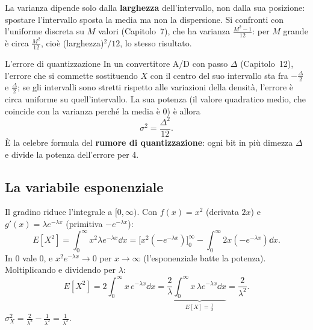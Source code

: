 La varianza dipende solo dalla \textbf{larghezza} dell'intervallo, non dalla sua posizione: spostare l'intervallo sposta
la media ma non la dispersione. Si confronti con l'uniforme discreta su $M$ valori (Capitolo~7), che ha varianza
$\frac{M^2 - 1}{12}$: per $M$ grande è circa $\frac{M^2}{12}$, cioè (larghezza)$^2/12$, lo stesso risultato.

\begin{esempio}{L'errore di quantizzazione}
In un convertitore A/D con passo $\Delta$ (Capitolo~12), l'errore che si commette sostituendo $X$ con il centro del
suo intervallo sta fra $-\frac{\Delta}{2}$ e $\frac{\Delta}{2}$; se gli intervalli sono stretti rispetto alle variazioni
della densità, l'errore è circa uniforme su quell'intervallo. La sua potenza (il valore quadratico medio, che coincide
con la varianza perché la media è 0) è allora
\[ \sigma^2 = \frac{\Delta^2}{12} . \]
È la celebre formula del \textbf{rumore di quantizzazione}: ogni bit in più dimezza $\Delta$ e divide la potenza
dell'errore per 4.
\end{esempio}

\subsection{La variabile esponenziale}


\begin{dimostrazione}
 Il gradino riduce l'integrale a $[0, \infty)$. Con $f(x) = x^2$ (derivata
$2x$) e $g'(x) = \lambda e^{-\lambda x}$ (primitiva $-e^{-\lambda x}$):
\[ E[X^2] = \int_0^{\infty} x^2 \lambda e^{-\lambda x} \dd x = \Big[ x^2 \left( -e^{-\lambda x} \right) \Big]_0^{\infty} -
   \int_0^{\infty} 2x \left( -e^{-\lambda x} \right) \dd x . \]
 In 0 vale 0, e $x^2 e^{-\lambda x} \to 0$ per $x \to \infty$ (l'esponenziale batte la potenza).
 Moltiplicando e dividendo per $\lambda$:
\[ E[X^2] = 2 \int_0^{\infty} x\, e^{-\lambda x} \dd x = \frac{2}{\lambda} \underbrace{\int_0^{\infty} x\, \lambda e^{-\lambda
   x} \dd x}_{E[X] = \frac{1}{\lambda}} = \frac{2}{\lambda^2} . \]
 $\sigma_X^2 = \frac{2}{\lambda^2} - \frac{1}{\lambda^2} = \frac{1}{\lambda^2}$.
\end{dimostrazione}


